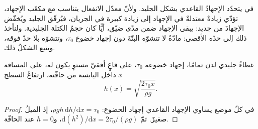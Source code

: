 في  يتحدّد الإجهادُ القاعدي بشكل
الجليد. ولأنّ معدّل الانفعال يتناسب مع مكعّب الإجهاد، تؤدّي زيادةٌ معتدلةٌ
في الإجهاد إلى زيادة كبيرة في الجريان، فيُرقّق الجليد
ويُخفّض الإجهادَ من جديد: يبقى الإجهاد ضمن مدًى ضيّق،
أيًّا كان حجمُ الكتلة الجليدية. ولنأخذ ذلك إلى حدّه الأقصى: مادّةٌ
لا تتشوّه البتّةَ دون إجهاد خضوع $\tau_0$، وتتشوّه بلا حدّ
فوقه، ويتبع الشكلُ ذلك.

\begin{proposition}\label{prop:b3:glaciology:nye}
غطاءٌ جليدي لدن تمامًا، إجهاد خضوعه $\tau_0$، على قاعٍ أفقيّ مستوٍ
يكون له، على المسافة $x$ داخل اليابسة من حافّته، ارتفاعُ السطح
\[
h(x) = \sqrt{\frac{2\tau_0x}{\rho g}} .
\]
\end{proposition}

\begin{proof}
في كلّ موضع يساوي الإجهاد القاعدي إجهاد الخضوع: $\rho gh\,\mathrm
dh/\mathrm dx = \tau_0$، إذ الميلُ صغيرٌ. ثمّ $\mathrm d(h^2)/\mathrm
dx = 2\tau_0/(\rho g)$، و$h = 0$ عند الحافّة.
\end{proof}

